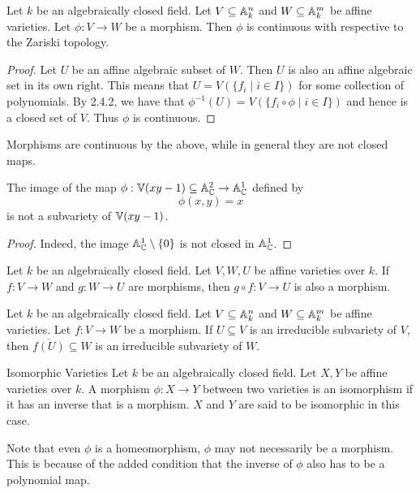 \documentclass[a4paper]{article}
\begin{document}
\begin{prp}{}{} Let $k$ be an algebraically closed field. Let $V\subseteq\mathbb{A}_k^n$ and $W\subseteq\mathbb{A}_k^m$ be affine varieties. Let $\phi:V\to W$ be a morphism. Then $\phi$ is continuous with respective to the Zariski topology. \tcbline
\begin{proof}
Let $U$ be an affine algebraic subset of $W$. Then $U$ is also an affine algebraic set in its own right. This means that $U=V(\{f_i\;|\;i\in I\})$ for some collection of polynomials. By 2.4.2, we have that $\phi^{-1}(U)=V(\{f_i\circ\phi\;|\;i\in I\})$ and hence is a closed set of $V$. Thus $\phi$ is continuous. 
\end{proof}
\end{prp}

Morphisms are continuous by the above, while in general they are not closed maps. 

\begin{eg}{}{} The image of the map $\phi:\mathbb{V}(xy-1)\subseteq\mathbb{A}_{\mathbb{C}}^2\to\mathbb{A}_{\mathbb{C}}^1$ defined by $$\phi(x,y)=x$$ is not a subvariety of $\mathbb{V}(xy-1)$. \tcbline
\begin{proof}
Indeed, the image $\mathbb{A}_{\mathbb{C}}^1\setminus\{0\}$ is not closed in $\mathbb{A}_{\mathbb{C}}^1$.
\end{proof}
\end{eg}

\begin{prp}{}{} Let $k$ be an algebraically closed field. Let $V,W,U$ be affine varieties over $k$. If $f:V\to W$ and $g:W\to U$ are morphisms, then $g\circ f:V\to U$ is also a morphism. 
\end{prp}

\begin{lmm}{}{} Let $k$ be an algebraically closed field. Let $V\subseteq\mathbb{A}_k^n$ and $W\subseteq\mathbb{A}_k^m$ be affine varieties. Let $f:V\to W$ be a morphism. If $U\subseteq V$ is an irreducible subvariety of $V$, then $\overline{f(U)}\subseteq W$ is an irreducible subvariety of $W$. 
\end{lmm}

\begin{defn}{Isomorphic Varieties}{} Let $k$ be an algebraically closed field. Let $X,Y$ be affine varieties over $k$. A morphism $\phi:X\to Y$ between two varieties is an isomorphism if it has an inverse that is a morphism. $X$ and $Y$ are said to be isomorphic in this case. 
\end{defn}

Note that even $\phi$ is a homeomorphism, $\phi$ may not necessarily be a morphism. This is because of the added condition that the inverse of $\phi$ also has to be a polynomial map. 
\end{document}
